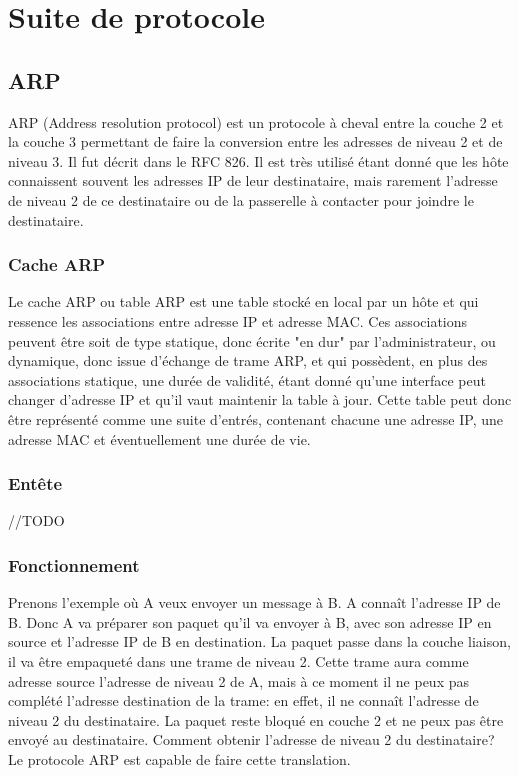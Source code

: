 \section{Suite de protocole}

\subsection{ARP} ARP (Address resolution protocol) est un protocole à cheval
entre la couche 2 et la couche 3 permettant de faire la conversion entre les
adresses de niveau 2 et de niveau 3. Il fut décrit dans le RFC 826\cite{url-RFC-ARP}.
Il est très utilisé étant donné que les hôte connaissent souvent les adresses
IP de leur destinataire, mais rarement l'adresse de niveau 2 de ce destinataire
ou de la passerelle à contacter pour joindre le destinataire.

\subsubsection{Cache ARP} Le cache ARP ou table ARP est une table stocké en
local par un hôte et qui ressence les associations entre adresse IP et adresse
MAC.  Ces associations peuvent être soit de type statique, donc écrite "en dur"
par l'administrateur, ou dynamique, donc issue d'échange de trame ARP, et qui
possèdent, en plus des associations statique, une durée de validité, étant
donné qu'une interface peut changer d'adresse IP et qu'il vaut maintenir la
table à jour.  Cette table peut donc être représenté comme une suite d'entrés,
contenant chacune une adresse IP, une adresse MAC et éventuellement une durée
de vie.

\subsubsection{Entête}
//TODO


\subsubsection{Fonctionnement} Prenons l'exemple où A veux envoyer un message à
B. A connaît l'adresse IP de B. Donc A va préparer son paquet qu'il va envoyer
à B, avec son adresse IP en source et l'adresse IP de B en destination. La
paquet passe dans la couche liaison, il va être empaqueté dans une trame de
niveau 2. Cette trame aura comme adresse source l'adresse de niveau 2 de A,
mais à ce moment il ne peux pas complété l'adresse destination de la trame: en
effet, il ne connaît l'adresse de niveau 2 du destinataire. La paquet reste
bloqué en couche 2 et ne peux pas être envoyé au destinataire. Comment obtenir
l'adresse de niveau 2 du destinataire?  Le protocole ARP est capable de faire
cette translation.

